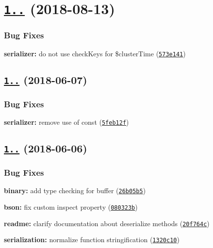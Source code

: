 \label{_1.1.0}%
 \section*{\href{https://github.com/mongodb/js-bson/compare/v1.0.9...v1.1.0}{\tt 1..} (2018-\/08-\/13)}

\subsubsection*{Bug Fixes}


\begin{DoxyItemize}
\item {\bfseries serializer\+:} do not use check\+Keys for \$cluster\+Time (\href{https://github.com/mongodb/js-bson/commit/573e141}{\tt 573e141})
\end{DoxyItemize}

\label{_1.0.9}%
 \subsection*{\href{https://github.com/mongodb/js-bson/compare/v1.0.8...v1.0.9}{\tt 1..} (2018-\/06-\/07)}

\subsubsection*{Bug Fixes}


\begin{DoxyItemize}
\item {\bfseries serializer\+:} remove use of {\ttfamily const} (\href{https://github.com/mongodb/js-bson/commit/5feb12f}{\tt 5feb12f})
\end{DoxyItemize}

\label{_1.0.7}%
 \subsection*{\href{https://github.com/mongodb/js-bson/compare/v1.0.6...v1.0.7}{\tt 1..} (2018-\/06-\/06)}

\subsubsection*{Bug Fixes}


\begin{DoxyItemize}
\item {\bfseries binary\+:} add type checking for buffer (\href{https://github.com/mongodb/js-bson/commit/26b05b5}{\tt 26b05b5})
\item {\bfseries bson\+:} fix custom inspect property (\href{https://github.com/mongodb/js-bson/commit/080323b}{\tt 080323b})
\item {\bfseries readme\+:} clarify documentation about deserialize methods (\href{https://github.com/mongodb/js-bson/commit/20f764c}{\tt 20f764c})
\item {\bfseries serialization\+:} normalize function stringification (\href{https://github.com/mongodb/js-bson/commit/1320c10}{\tt 1320c10})
\end{DoxyItemize}

